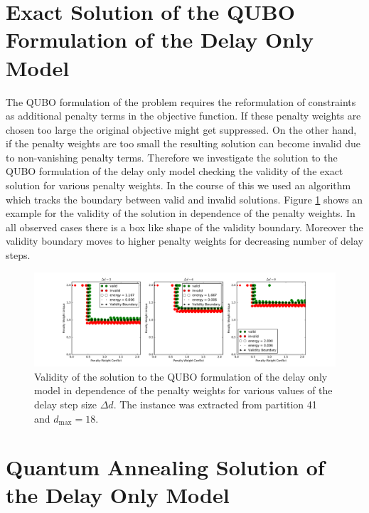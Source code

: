 \documentclass{article}
\begin{document}
\section{Exact Solution of the QUBO Formulation of the Delay Only Model}
The QUBO formulation of the problem requires the reformulation of constraints as additional penalty terms in the objective function.
If these penalty weights are chosen too large the original objective might get suppressed. 
On the other hand, if the penalty weights are too small the resulting solution can become invalid due to non-vanishing penalty terms.
Therefore we investigate the solution to the QUBO formulation of the delay only model checking the validity of the exact solution for various penalty weights.
In the course of this we used an algorithm which tracks the boundary between valid and invalid solutions.
Figure \ref{fig:validityMaps} shows an example for the validity of the solution in dependence of the penalty weights.
In all observed cases there is a box like shape of the validity boundary.
Moreover the validity boundary moves to higher penalty weights for decreasing number of delay steps.
\begin{figure}[htpb]
    \centering
    \includegraphics[width=1.0\linewidth]{pics/validity_maps_examples.pdf}
    \caption{Validity of the solution to the QUBO formulation of the delay only model in dependence of the penalty weights for various values of the delay step size $\Delta d$. The instance was extracted from partition 41 and $d_\text{max}=18$.}
    \label{fig:validityMaps}
\end{figure}
\section{Quantum Annealing Solution of the Delay Only Model}
\end{document}
